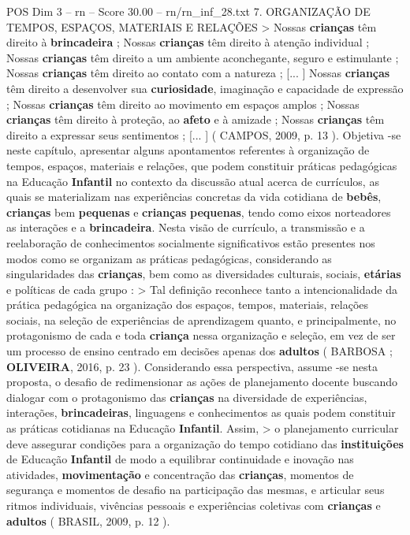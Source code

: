 \begin{textsample}{POS Dim 3 – rn – Score 30.00 – rn/rn\_inf\_28.txt}  \label{ex:f3_pos_091}
7.
ORGANIZAÇÃO DE TEMPOS, ESPAÇOS, MATERIAIS E RELAÇÕES > Nossas \textbf{crianças} têm direito à \textbf{brincadeira} ; Nossas \textbf{crianças} têm direito à atenção individual ; Nossas \textbf{crianças} têm direito a um ambiente aconchegante, seguro e estimulante ; Nossas \textbf{crianças} têm direito ao contato com a natureza ; [... ] Nossas \textbf{crianças} têm direito a desenvolver sua \textbf{curiosidade}, imaginação e capacidade de expressão ; Nossas \textbf{crianças} têm direito ao movimento em espaços amplos ; Nossas \textbf{crianças} têm direito à proteção, ao \textbf{afeto} e à amizade ; Nossas \textbf{crianças} têm direito a expressar seus sentimentos ; [... ] ( CAMPOS, 2009, p. 13 ).
Objetiva -se neste capítulo, apresentar alguns apontamentos referentes à organização de tempos, espaços, materiais e relações, que podem constituir práticas pedagógicas na Educação \textbf{Infantil} no contexto da discussão atual acerca de currículos, as quais se materializam nas experiências concretas da vida cotidiana de \textbf{bebês}, \textbf{crianças} bem \textbf{pequenas} e \textbf{crianças} \textbf{pequenas}, tendo como eixos norteadores as interações e a \textbf{brincadeira}.
Nesta visão de currículo, a transmissão e a reelaboração de conhecimentos socialmente significativos estão presentes nos modos como se organizam as práticas pedagógicas, considerando as singularidades das \textbf{crianças}, bem como as diversidades culturais, sociais, \textbf{etárias} e políticas de cada grupo : > Tal definição reconhece tanto a intencionalidade da prática pedagógica na organização dos espaços, tempos, materiais, relações sociais, na seleção de experiências de aprendizagem quanto, e principalmente, no protagonismo de cada e toda \textbf{criança} nessa organização e seleção, em vez de ser um processo de ensino centrado em decisões apenas dos \textbf{adultos} ( BARBOSA ; \textbf{OLIVEIRA}, 2016, p. 23 ).
Considerando essa perspectiva, assume -se nesta proposta, o desafio de redimensionar as ações de planejamento docente buscando dialogar com o protagonismo das \textbf{crianças} na diversidade de experiências, interações, \textbf{brincadeiras}, linguagens e conhecimentos as quais podem constituir as práticas cotidianas na Educação \textbf{Infantil}.
Assim, > o planejamento curricular deve assegurar condições para a organização do tempo cotidiano das \textbf{instituições} de Educação \textbf{Infantil} de modo a equilibrar continuidade e inovação nas atividades, \textbf{movimentação} e concentração das \textbf{crianças}, momentos de segurança e momentos de desafio na participação das mesmas, e articular seus ritmos individuais, vivências pessoais e experiências coletivas com \textbf{crianças} e \textbf{adultos} ( BRASIL, 2009, p. 12 ).

\end{textsample}
